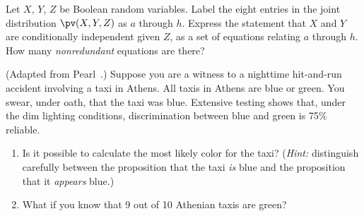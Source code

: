 \begin{exercise}
Let \(X\), \(Y\), \(Z\) be Boolean random variables. Label the eight entries
in the joint distribution \(\pv(X,Y,Z)\) as \(a\) through \(h\).
Express the statement that \(X\) and \(Y\) are conditionally independent
given \(Z\), as a set of equations relating \(a\) through \(h\).
How many {\em nonredundant} equations are there?
\end{exercise} 

\begin{uexercise}
(Adapted from Pearl~\citeyear{Pearl:1988}.)  Suppose you are a witness
to a nighttime hit-and-run accident involving a taxi in Athens. All
taxis in Athens are blue or green. You
swear, under oath, that the taxi was blue. Extensive testing shows
that, under the dim lighting conditions, discrimination between blue
and green is 75\% reliable.
\begin{enumerate}
\item  Is it possible to calculate the most
likely color for the taxi? ({\em Hint:} distinguish carefully between
the proposition that the taxi {\em is} blue and the proposition that
it {\em appears} blue.) 
\item What if you know that 9 out of 10 Athenian taxis are green?
\end{enumerate}
\end{uexercise} 


